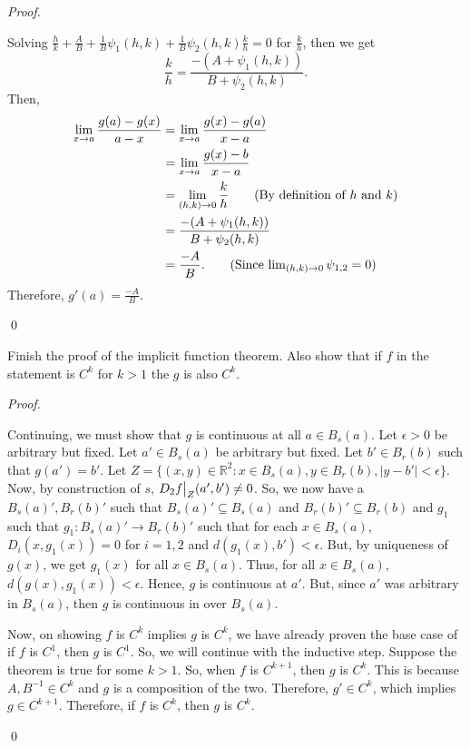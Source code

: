 \documentclass[12pt]{article}
\newenvironment{problem}[2][Problem]{\begin{trivlist}
\item[\hskip \labelsep {\bfseries #1}\hskip \labelsep {\bfseries
#2.}]}{\end{trivlist}}
\newenvironment{sol}
    {\emph{Proof.}
    }
    {
    \qed
    }
\newcommand\restr[2]{{%
  \left.\kern-\nulldelimiterspace %
  #1 %
  \vphantom{\big|} %
  \right|_{#2} %
  }}
\begin{document}
\begin{problem}{21}
\begin{itemize}
    \begin{sol}
    Solving $\frac{h}{k} + \frac{A}{B} + \frac{1}{B}\psi_1(h,k) + \frac{1}{B}\psi_2(h,k)\frac{k}{h} = 0$ for $\frac{k}{h}$, then we get $$\frac{k}{h} = \frac{-(A + \psi_1(h,k))}{B + \psi_2(h,k)}.$$ Then, \begin{align*}
        \lim_{x \to a}\frac{g(a) - g(x)}{a-x} &= \lim_{x \to a}\frac{g(x) - g(a)}{x-a} \\ &= \lim_{x \to a}\frac{g(x) - b}{x-a} \\ &= \lim_{(h,k) \to 0} \frac{k}{h} \tag*{(By definition of $h$ and $k$)}\\ &= \frac{-(A + \psi_1(h,k))}{B + \psi_2(h,k)} \\ &= \frac{-A}{B}. \tag*{(Since $\lim_{(h,k) \to 0} \psi_{1,2} = 0$)}
    \end{align*}
    Therefore, $g'(a) = \frac{-A}{B}$.
    \end{sol}
\end{itemize}
\end{problem}


\begin{problem}{22}
Finish the proof of the implicit function theorem. Also show that if $f$ in the statement is $C^k$ for $k > 1$ the $g$ is also $C^k$.
\end{problem}

\begin{sol}
Continuing, we must show that $g$ is continuous at all $a \in B_s(a)$. Let $\epsilon > 0$ be arbitrary but fixed. Let $a' \in B_s(a)$ be arbitrary but fixed. Let $b' \in B_r(b)$ such that $g(a') = b'$. Let $Z = \{(x,y) \in \mathbb{R}^2 : x \in B_s(a),y \in B_r(b),\left|y - b'\right| < \epsilon\}$. Now, by construction of $s$, $D_2\restr{f}{Z}(a',b') \neq 0$. So, we now have a $B_s(a)',B_r(b)'$ such that $B_s(a)' \subseteq B_s(a)$ and $B_r(b)' \subseteq B_r(b)$ and $g_1$ such that $g_1 : B_s(a)' \to B_r(b)'$ such that for each $x \in B_s(a)$, $D_i(x,g_1(x)) = 0$ for $i = 1,2$ and $d(g_1(x),b') < \epsilon$. But, by uniqueness of $g(x)$, we get $g_1(x)$ for all $x \in B_s(a)$. Thus, for all $x \in B_s(a)$, $d(g(x),g_1(x)) < \epsilon$. Hence, $g$ is continuous at $a'$. But, since $a'$ was arbitrary in $B_s(a)$, then $g$ is continuous in over $B_s(a)$.  

Now, on showing $f$ is $C^k$ implies $g$ is $C^k$, we have already proven the base case of if $f$ is $C^1$, then $g$ is $C^1$. So, we will continue with the inductive step. Suppose the theorem is true for some $k > 1$. So, when $f$ is $C^{k+1}$, then $g$ is $C^k$. This is because $A,B^{-1} \in C^k$ and $g$ is a composition of the two. Therefore, $g' \in C^k$, which implies $g \in C^{k+1}$. Therefore, if $f$ is $C^k$, then $g$ is $C^k$.  
\end{sol}
\end{document}
